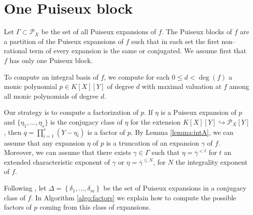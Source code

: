 \documentclass[a4paper,11pt]{amsart}%
\theoremstyle{definition}
\theoremstyle{plain}
\theoremstyle{remark}
\newcommand{\Px}{{\mathcal{P}_X}}
\begin{document}
\section{One Puiseux block}

Let $\Gamma \subset \Px$ be the set of all Puiseux expansions of $f$. The Puiseux blocks of $f$ are a partition of the Puiseux expansions of $f$ such that in each set the first non--rational term of every expansion is the same or conjugated. We assume first that $f$ has only one Puiseux block.

To compute an integral basis of $f$, we compute for each $0 \le d < \deg(f)$ a monic polynomial $p \in K[X][Y]$ of degree $d$ with maximal valuation at $f$ among all monic polynomials of degree $d$.

Our strategy is to compute a factorization of $p$. If $\eta$ is a Puiseux expansion of $p$ and $\{\eta_1, \dots, \eta_s\}$ is the conjugacy class of $\eta$ for the extension $K[X][Y] \hookrightarrow \Px[Y]$, then $q = \prod_{i = 1}^s (Y - \eta_i)$ is a factor of $p$.
By Lemma \ref{lemma:intA}, we can assume that any expansion $\eta$ of $p$ is a truncation of an expansion $\gamma$ of $f$. Moreover, we can assume that there exists $\gamma \in \Gamma$ such that $\eta = \overline{\gamma}^{<t}$ for $t$ an extended characteristic exponent of $\gamma$ or $\eta = \overline{\gamma}^{\le N}$, for $N$ the integrality exponent of $f$.

%

Following \cite[Algorithm 6]{intbas}, let $\Delta=\left\{  \delta_{1},\ldots,\delta_{m}\right\}$ be
the set of Puiseux expansions in a conjugacy class of $f$. In Algorithm \ref{algo:factors} we explain how to compute the possible factors of $p$ coming from this class of expansions.
\end{document}

